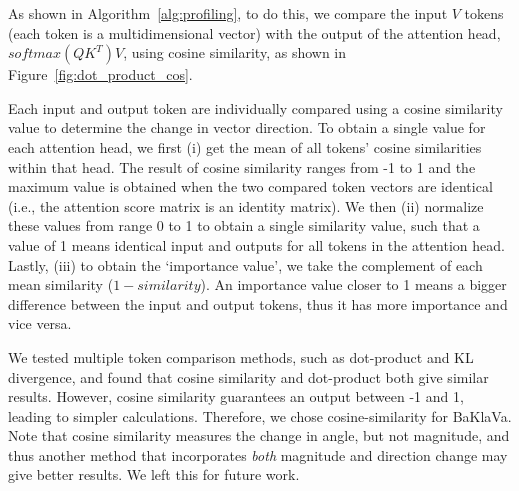 As shown in Algorithm~\ref{alg:profiling}, to do this, we compare the input $V$ tokens (each token is a multidimensional vector) with the output of the attention head, $softmax(QK^T)V$, using cosine similarity, as shown in Figure~\ref{fig:dot_product_cos}. 
  
Each input and output token are individually compared using a cosine similarity value to determine the change in vector direction. To obtain a single value for each attention head, we first (i) get the mean of all tokens' cosine similarities within that head. The result of cosine similarity ranges from -1 to 1 and the maximum value is obtained when the two compared token vectors are identical (i.e., the attention score matrix is an identity matrix). We then (ii) normalize these values from range 0 to 1 to obtain a single similarity value, such that a value of 1 means identical input and outputs for all tokens in the attention head. Lastly, (iii) to obtain the `importance value', we take the complement of each mean similarity ($1 - similarity$). An importance value closer to 1 means a bigger difference between the input and output tokens, thus it has more importance and vice versa. 

We tested multiple token comparison methods, such as dot-product and KL divergence, and found that cosine similarity and dot-product both give similar results.  However, cosine similarity guarantees an output between -1 and 1, leading to simpler calculations. Therefore, we chose cosine-similarity for BaKlaVa. Note that cosine similarity measures the change in angle, but not magnitude, and thus another method that incorporates {\em both} magnitude and direction change may give better results. We left this for future work. 

